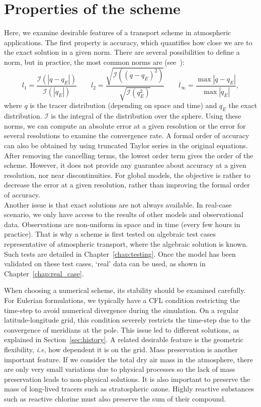 \section{Properties of the scheme}
\label{sec:properties}
Here, we examine desirable features of a transport scheme in atmospheric
applications. The first property is accuracy, which quantifies how close we are to
the exact solution in a given norm. There are several possibilities to define a
norm, but in practice, the most common norms are (see~\cite{Williamson1992}):
\def\II{\mathcal{I}}
\begin{equation}
  l_1 = \frac{\II(|q-q_E|)}{\II(|q_E|)}
  \qquad
  l_2 = \frac{\sqrt{\II({(q-q_E)}^2)}}{\sqrt{\II(q_E^2)}}
  \qquad
  l_\infty = \frac{\max |q-q_E|}{\max{|q_E|}},
\label{eqn:err_norms}
\end{equation}
where $q$ is the tracer distribution (depending on space and time) and $q_E$ the
exact distribution. $\II$ is the integral of the distribution over the sphere.
Using these norms, we can compute an absolute error at a given resolution or the
error for several resolutions to examine the convergence rate. A formal order of
accuracy can also be obtained by using truncated Taylor series in the original
equations. After removing the cancelling terms, the lowest order term gives the
order of the scheme. However, it does not provide any guarantee about accuracy at
a given resolution, nor near discontinuities. For global models, the objective
is rather to decrease the error at a given resolution, rather than improving the
formal order of accuracy.  \\
Another issue is that exact solutions are not always available. In real-case
scenario, we only have access to the results of other models and observational
data. Observations are non-uniform in space and in time (every few hours in
practice). That is why a scheme is first tested on algebraic test cases
representative of atmospheric transport, where the algebraic solution is known.
Such tests are detailed in Chapter~\ref{chap:testing}. Once the model has been
validated on these test cases, `real' data can be used, as shown in
Chapter~\ref{chap:real_case}.

When choosing a numerical scheme, its stability should be examined carefully.
For Eulerian formulations, we typically have a \gls{CFL} condition restricting
the time-step to avoid numerical divergence during the simulation. On a regular
latitude-longitude grid, this condition severely restricts the time-step due to
the convergence of meridians at the pole. This issue led to different solutions, as
explained in Section~\ref{sec:history}. A related desirable feature is the
geometric flexibility, \textit{i.e}, how dependent it is on the grid.
Mass preservation is another important feature. If we consider the total dry air
mass in the atmosphere, there are only very small variations due to physical
processes so the lack of mass preservation leads to non-physical solutions. It is
also important to preserve the mass of long-lived tracers such as stratospheric
ozone. Highly reactive substances such as reactive chlorine must also preserve
the sum of their compound.

